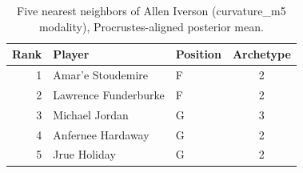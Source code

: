 \begin{table}[htbp]
  \centering\small
  \begin{tabular}{rllc}
    \toprule
    Rank & Player & Position & Archetype \\
    \midrule
    1 & Amar'e Stoudemire & F & 2 \\
    2 & Lawrence Funderburke & F & 2 \\
    3 & Michael Jordan & G & 3 \\
    4 & Anfernee Hardaway & G & 2 \\
    5 & Jrue Holiday & G & 2 \\
    \bottomrule
  \end{tabular}
  \caption{Five nearest neighbors of Allen Iverson (curvature_m5 modality), Procrustes-aligned posterior mean.}
  \label{tab:Allen_Iverson_neighbors_curvature_m5}
\end{table}

